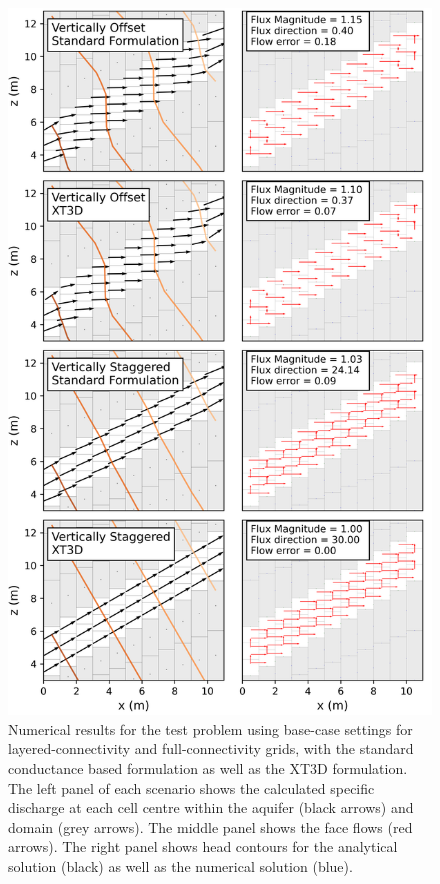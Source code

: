 \documentclass{article}
\begin{document}
\begin{figure}[p!]
	\begin{center}
	\includegraphics[scale=0.8]{../figures/fig2_paper.png}
	\caption{Numerical results for the test problem using base-case settings for layered-connectivity and full-connectivity grids, with the standard conductance based formulation as well as the XT3D formulation. The left panel of each scenario shows the calculated specific discharge at each cell centre within the aquifer (black arrows) and domain (grey arrows). The middle panel shows the face flows (red arrows). The right panel shows head contours for the analytical solution (black) as well as the numerical solution (blue).}
	\label{fig:fig2}
	\end{center}
\end{figure}
\end{document}
